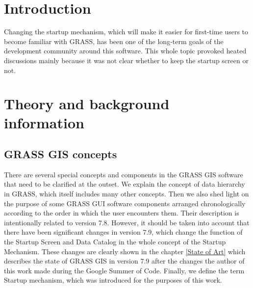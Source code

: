 \documentclass[a4paper,10pt,twoside]{article}
\begin{document}
\newpage
\vspace*{-1cm}
\pagestyle{fancy}
\section*{Introduction}
\large
\setcounter{page}{13}  %





Changing the startup mechanism, which will make it easier for first-time users to become familiar with GRASS, has been one of the long-term goals of the development community around this software. This whole topic provoked heated discussions mainly because it was not clear whether to keep the startup screen or not.




\newpage
\vspace*{-1cm}
\section{Theory and background information}
\label{section:explanation}



\subsection{GRASS GIS concepts}
\noindent There are several special concepts and components in the GRASS GIS software that need to be clarified at the outset. We explain the concept of data hierarchy in GRASS, which itself includes many other concepts. Then we also shed light on the purpose of some GRASS GUI software components arranged chronologically according to the order in which the user encounters them. Their description is intentionally related to version 7.8. However, it should be taken into account that there have been significant changes in version 7.9, which change the function of the Startup Screen and Data Catalog in the whole concept of the Startup Mechanism. These changes are clearly shown in the chapter \ref{State of Art} which describes the state of GRASS GIS in version 7.9 after the changes the author of this work made during the Google Summer of Code.
Finally, we define the term Startup mechanism, which was introduced for the purposes of this work.
\end{document}

